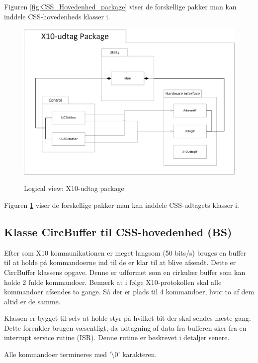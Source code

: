 Figuren \ref{fig:CSS_Hovedenhed_package} viser de forskellige pakker man kan inddele CSS-hovedenheds klasser i.

\clearpage

\begin{figure}[!htb]
     {\includegraphics[width=\textwidth]{billeder/uml/logical_view_CSS_Udtag}}
     \caption{Logical view: X10-udtag package}
     \label{fig:CSS_Udtag_package}
\end{figure}

Figuren \ref{fig:CSS_Udtag_package} viser de forskellige pakker man kan inddele CSS-udtagets klasser i. 

\clearpage

\subsection{Klasse CircBuffer til CSS-hovedenhed (BS)}
Efter som X10 kommunikationen er meget langsom (50 bits/s) bruges en buffer til at holde på kommandoerne ind til de er klar til at blive afsendt. Dette er CircBuffer klassens opgave.
Denne er udformet som en cirkulær buffer som kan holde 2 fulde kommandoer. Bemærk at i følge X10-protokollen skal alle kommandoer afsendes to gange. Så der er plads til 4 kommandoer, hvor to af dem altid er de samme.

Klassen er bygget til selv at holde styr på hvilket bit der skal sendes næste gang. Dette forenkler brugen væsentligt, da udtagning af data fra bufferen sker fra en interrupt service rutine (ISR). Denne rutine er beskrevet i detaljer senere.

Alle kommandoer termineres med '\textbackslash 0' karakteren. 

